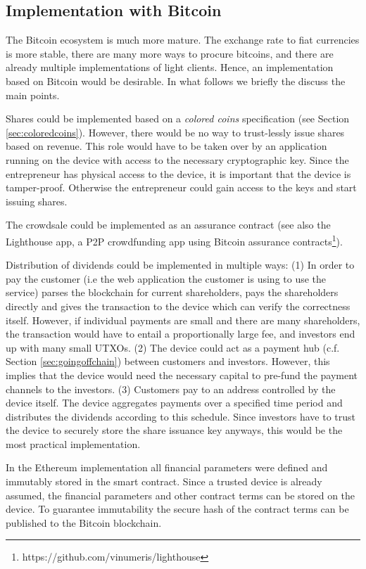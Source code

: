 \subsection{Implementation with Bitcoin}

The Bitcoin ecosystem is much more mature. The exchange rate to fiat currencies is more stable, there are many more ways to procure bitcoins, and there are already multiple implementations of light clients. Hence, an implementation based on Bitcoin would be desirable. In what follows we briefly the discuss the main points.

Shares could be implemented based on a \emph{colored coins} specification (see Section \ref{sec:coloredcoins}). However, there would be no way to trust-lessly issue shares based on revenue. This role would have to be taken over by an application running on the device with access to the necessary cryptographic key. Since the entrepreneur has physical access to the device, it is important that the device is tamper-proof. Otherwise the entrepreneur could gain access to the keys and start issuing shares.

The crowdsale could be implemented as an assurance contract \parencite{smartcontr} (see also the Lighthouse app, a \ac{P2P} crowdfunding app using Bitcoin assurance contracts\footnote{https://github.com/vinumeris/lighthouse}).

 Distribution of dividends could be implemented in multiple ways: (1) In order to pay the customer (i.e the web application the customer is using to use the service) parses the blockchain for current shareholders, pays the shareholders directly and gives the transaction to the device which can verify the correctness itself. However, if individual payments are small and there are many shareholders, the transaction would have to entail a proportionally large fee, and investors end up with many small \ac{UTXO}s. (2) The device could act as a payment hub (c.f. Section \ref{sec:goingoffchain}) between customers and investors. However, this implies that the device would need the necessary capital to pre-fund the payment channels to the investors. (3) Customers pay to an address controlled by the device itself. The device aggregates payments over a specified time period and distributes the dividends according to this schedule. Since investors have to trust the device to securely store the share issuance key anyways, this would be the most practical implementation. 

In the Ethereum implementation all financial parameters were defined and immutably stored in the smart contract. Since a trusted device is already assumed, the financial parameters and other contract terms can be stored on the device. To guarantee immutability the secure hash of the contract terms can be published to the Bitcoin blockchain. 


